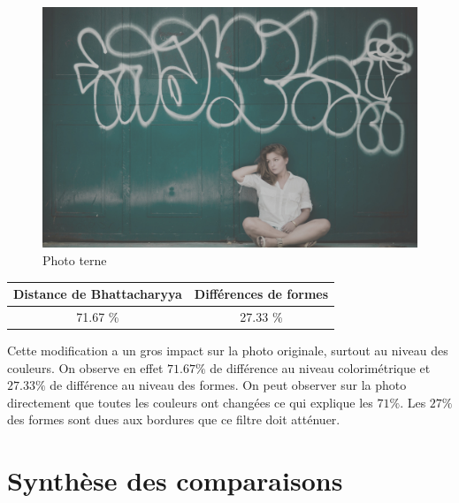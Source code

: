 \documentclass[]{article}
\begin{document}
\begin{figure}[htbp]
\centering
\includegraphics{photos/terne.jpg}
\caption{Photo terne}
\end{figure}

\begin{center}
\begin{tabular}{|c|c|}
  \hline
  Distance de Bhattacharyya & Différences de formes \\
  \hline
  71.67 \% & 27.33 \% \\
  \hline
\end{tabular}
\end{center}

Cette modification a un gros impact sur la photo originale, surtout au
niveau des couleurs. On observe en effet $71.67 \%$ de différence au
niveau colorimétrique et $27.33 \%$ de différence au niveau des formes.
On peut observer sur la photo directement que toutes les couleurs ont
changées ce qui explique les $71 \%$. Les $27 \%$ des formes sont dues aux
bordures que ce filtre doit atténuer.

\newpage

\section{Synthèse des comparaisons}\label{synthese-des-comparaisons}

\begin{center}
\end{center}
\end{document}
